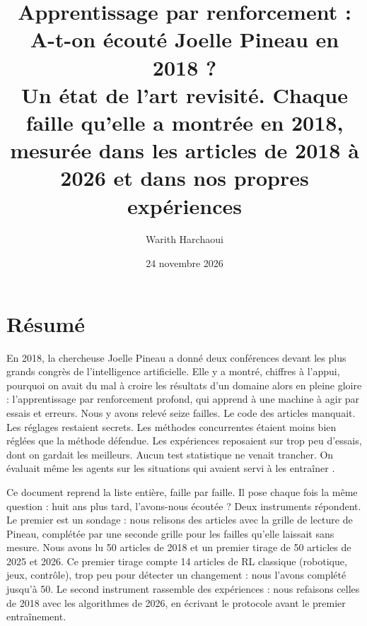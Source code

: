 \documentclass[11pt,a4paper]{article}
\title{\textbf{Apprentissage par renforcement : A-t-on écouté Joelle
Pineau en 2018 ?}\\[0.4em]\large Un état de l'art revisité. Chaque
faille qu'elle a montrée en 2018, mesurée dans les articles de 2018 à
2026 et dans nos propres expériences}
\author{Warith Harchaoui}
\date{24 novembre 2026}
\begin{document}
\maketitle

\section*{Résumé}\label{ruxe9sumuxe9}

En 2018, la chercheuse Joelle Pineau a donné deux conférences devant les
plus grands congrès de l'intelligence artificielle. Elle y a montré,
chiffres à l'appui, pourquoi on avait du mal à croire les résultats d'un
domaine alors en pleine gloire : l'apprentissage par renforcement
profond, qui apprend à une machine à agir par essais et erreurs. Nous y
avons relevé seize failles. Le code des articles manquait. Les réglages
restaient secrets. Les méthodes concurrentes étaient moins bien réglées
que la méthode défendue. Les expériences reposaient sur trop peu
d'essais, dont on gardait les meilleurs. Aucun test statistique ne
venait trancher. On évaluait même les agents sur les situations qui
avaient servi à les entraîner
\autocite{pineau2018iclr,pineau2018neurips,henderson2018matters}.

Ce document reprend la liste entière, faille par faille. Il pose chaque
fois la même question : huit ans plus tard, l'avons-nous écoutée ? Deux
instruments répondent. Le premier est un sondage : nous relisons des
articles avec la grille de lecture de Pineau, complétée par une seconde
grille pour les failles qu'elle laissait sans mesure. Nous avons lu 50
articles de 2018 et un premier tirage de 50 articles de 2025 et 2026. Ce
premier tirage compte 14 articles de RL classique (robotique, jeux,
contrôle), trop peu pour détecter un changement : nous l'avons complété
jusqu'à 50. Le second instrument rassemble des expériences : nous
refaisons celles de 2018 avec les algorithmes de 2026, en écrivant le
protocole avant le premier entraînement.
\end{document}
